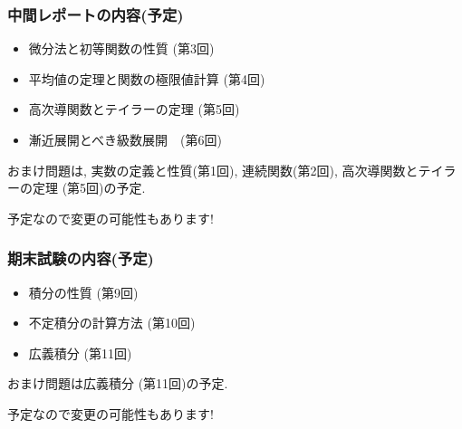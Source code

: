 \documentclass[11pt,dvipdfmx]{beamer}
\theoremstyle{definition}
\theoremstyle{remark}
\begin{document}
\begin{frame}
\frametitle{中間レポートの内容(予定)}
 \begin{itemize}
\item 微分法と初等関数の性質 (第3回)
\item 平均値の定理と関数の極限値計算 (第4回)
\item 高次導関数とテイラーの定理 (第5回)
\item 漸近展開とべき級数展開　(第6回)
 \end{itemize}
 
 おまけ問題は, 実数の定義と性質(第1回), 連続関数(第2回), 高次導関数とテイラーの定理 (第5回)の予定.
   \begin{alertblock}{}
  \begin{center}
予定なので変更の可能性もあります!
  \end{center}
 \end{alertblock}
 
 \end{frame}
 
 \begin{frame}
\frametitle{期末試験の内容(予定)}
 \begin{itemize}
\item 積分の性質 (第9回)
\item 不定積分の計算方法 (第10回)
\item 広義積分 (第11回)
 \end{itemize}
 
 おまけ問題は広義積分 (第11回)の予定.
 
   \begin{alertblock}{}
  \begin{center}
予定なので変更の可能性もあります!
  \end{center}
 \end{alertblock}
 


\end{frame}
\end{document}
